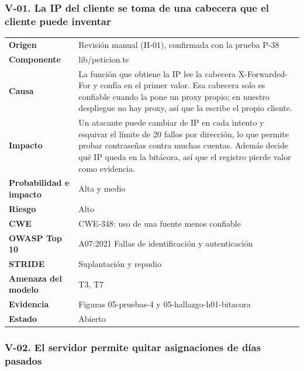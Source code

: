 \documentclass[12pt, letterpaper]{article}
\begin{document}
\subsubsection*{V-01. La IP del cliente se toma de una cabecera que el cliente puede inventar}

\begingroup\small\setlength{\tabcolsep}{4pt}\renewcommand{\arraystretch}{1.25}
\begin{longtable}{L{0.24}L{0.70}}
\toprule
\endfirsthead
\toprule
\endhead
\bottomrule
\endfoot
\textbf{Origen} & Revisión manual (H-01), confirmada con la prueba P-38 \\
\textbf{Componente} & lib/peticion.ts \\
\textbf{Causa} & La función que obtiene la IP lee la cabecera X-Forwarded-For y confía en el primer valor. Esa cabecera solo es confiable cuando la pone un proxy propio; en nuestro despliegue no hay proxy, así que la escribe el propio cliente. \\
\textbf{Impacto} & Un atacante puede cambiar de IP en cada intento y esquivar el límite de 20 fallos por dirección, lo que permite probar contraseñas contra muchas cuentas. Además decide qué IP queda en la bitácora, así que el registro pierde valor como evidencia. \\
\textbf{Probabilidad e impacto} & Alta y medio \\
\textbf{Riesgo} & Alto \\
\textbf{CWE} & CWE-348: uso de una fuente menos confiable \\
\textbf{OWASP Top 10} & A07:2021 Fallas de identificación y autenticación \\
\textbf{STRIDE} & Suplantación y repudio \\
\textbf{Amenaza del modelo} & T3, T7 \\
\textbf{Evidencia} & Figuras 05-pruebas-4 y 05-hallazgo-h01-bitacora \\
\textbf{Estado} & Abierto \\
\end{longtable}
\endgroup

\subsubsection*{V-02. El servidor permite quitar asignaciones de días pasados}
\end{document}
